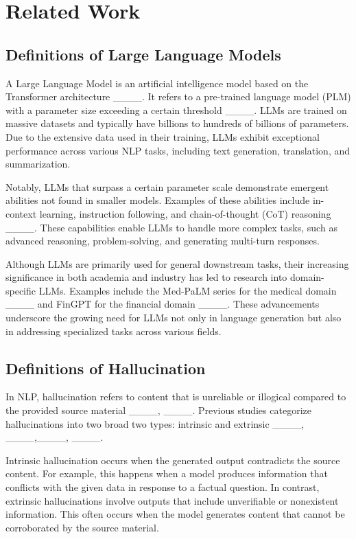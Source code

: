 \section{Related Work}
\label{sec:relatedwork}

\subsection{Definitions of Large Language Models}
A Large Language Model is an artificial intelligence model based on the Transformer architecture ____. It refers to a pre-trained language model (PLM) with a parameter size exceeding a certain threshold ____. LLMs are trained on massive datasets and typically have billions to hundreds of billions of parameters. Due to the extensive data used in their training, LLMs exhibit exceptional performance across various NLP tasks, including text generation, translation, and summarization.

Notably, LLMs that surpass a certain parameter scale demonstrate emergent abilities not found in smaller models. Examples of these abilities include in-context learning, instruction following, and chain-of-thought (CoT) reasoning ____. These capabilities enable LLMs to handle more complex tasks, such as advanced reasoning, problem-solving, and generating multi-turn responses.

Although LLMs are primarily used for general downstream tasks, their increasing significance in both academia and industry has led to research into domain-specific LLMs. Examples include the Med-PaLM series for the medical domain ____ and FinGPT for the financial domain ____. These advancements underscore the growing need for LLMs not only in language generation but also in addressing specialized tasks across various fields.

\subsection{Definitions of Hallucination}
In NLP, hallucination refers to content that is unreliable or illogical compared to the provided source material ____, ____. Previous studies categorize hallucinations into two broad two types: intrinsic and extrinsic ____, ____,____, ____.

Intrinsic hallucination occurs when the generated output contradicts the source content. For example, this happens when a model produces information that conflicts with the given data in response to a factual question. In contrast, extrinsic hallucinations involve outputs that include unverifiable or nonexistent information. This often occurs when the model generates content that cannot be corroborated by the source material.

